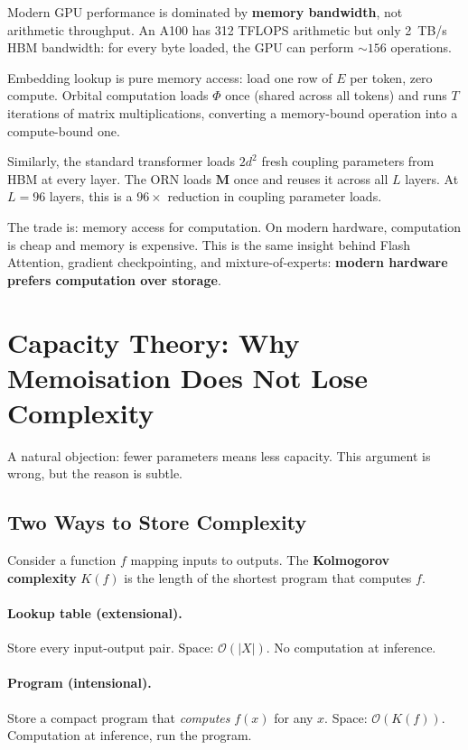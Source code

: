 \documentclass[11pt, a4paper]{article}
\newcommand{\M}{\mathbf{M}}
\newcommand{\bigO}{\mathcal{O}}
\theoremstyle{remark}
\begin{document}
Modern GPU performance is dominated by \textbf{memory bandwidth}, not arithmetic throughput.
An A100 has 312 TFLOPS arithmetic but only 2~TB/s HBM bandwidth: for every byte loaded, the GPU can perform ${\sim}156$ operations.

Embedding lookup is pure memory access: load one row of $E$ per token, zero compute.
Orbital computation loads $\Phi$ once (shared across all tokens) and runs $T$ iterations of matrix multiplications, converting a memory-bound operation into a compute-bound one.

Similarly, the standard transformer loads $2d^2$ fresh coupling parameters from HBM at every layer.
The ORN loads $\M$ once and reuses it across all $L$ layers.
At $L{=}96$ layers, this is a $96\times$ reduction in coupling parameter loads.

The trade is: memory access for computation.
On modern hardware, computation is cheap and memory is expensive.
This is the same insight behind Flash Attention, gradient checkpointing, and mixture-of-experts: \textbf{modern hardware prefers computation over storage}.


\section{Capacity Theory: Why Memoisation Does Not Lose Complexity}
\label{sec:capacity}

A natural objection: fewer parameters means less capacity.
This argument is wrong, but the reason is subtle.

\subsection{Two Ways to Store Complexity}

Consider a function $f$ mapping inputs to outputs.
The \textbf{Kolmogorov complexity} $K(f)$ is the length of the shortest program that computes $f$.

\paragraph{Lookup table (extensional).}
Store every input-output pair.
Space: $\bigO(|X|)$.
No computation at inference.

\paragraph{Program (intensional).}
Store a compact program that \emph{computes} $f(x)$ for any $x$.
Space: $\bigO(K(f))$.
Computation at inference, run the program.
\end{document}
